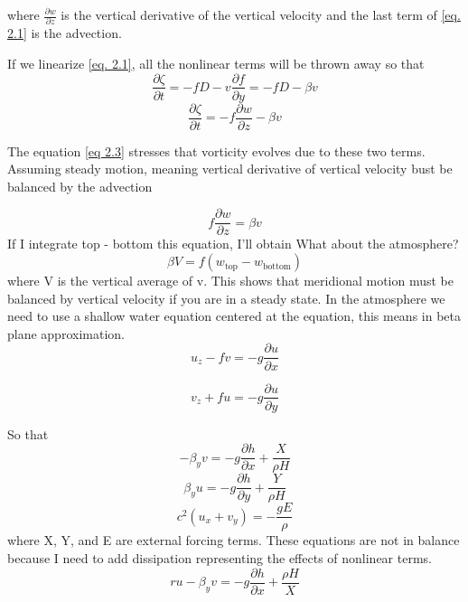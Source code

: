 where $\frac{\partial w}{\partial z}$ is the vertical derivative of the vertical velocity and the last term of \ref{eq. 2.1} is the advection.

If we linearize \ref{eq. 2.1}, all the nonlinear terms will be thrown away so that
\begin{equation}\label{eq 2.3}
	\frac{\partial \zeta}{\partial t} = - f D - v \frac{\partial f}{\partial y} = - f D - \beta v
\end{equation}
\begin{equation}
	\frac{\partial \zeta}{\partial t} = - f \frac{\partial w}{\partial z} - \beta v
\end{equation}

The equation \ref{eq 2.3} stresses that vorticity evolves due to these two terms.
Assuming steady motion, meaning vertical derivative of vertical velocity bust be balanced by the advection

\begin{equation}
	f \frac{\partial w}{\partial z} = \beta v
\end{equation}
If I integrate top - bottom this equation, I'll obtain
What about the atmosphere?
\begin{equation}
	\beta V = f(w_{\text{top}} - w_{\text{bottom}})

\end{equation}
where V is the vertical average of v.
This shows that meridional motion must be balanced by vertical velocity if you are in a steady state.
In the atmosphere we need to use a shallow water equation centered at the equation, this means in beta plane approximation.
\begin{equation}
	u_z- fv = -g \frac{\partial u}{\partial x}
\end{equation}

\begin{equation}
	v_z + fu = -g \frac{\partial u}{\partial y}
\end{equation}

So that
$$-\beta_y v = -g \frac{\partial h}{\partial x} + \frac{X}{\rho H}$$
$$\beta_y u = -g \frac{\partial h}{\partial y} + \frac{Y}{\rho H}$$
$$c^2 (u_x + v_y) = -\frac{gE}{\rho}$$
where X, Y, and E are external forcing terms.
These equations are not in balance because I need to add dissipation representing the effects of nonlinear terms.
\begin{equation}\label{eq 2.8}
	r u - \beta_y v = -g \frac{\partial h}{\partial x} + \frac{\rho H}{X}
\end{equation}


